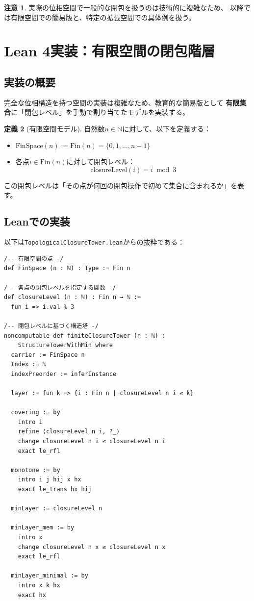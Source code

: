 \documentclass[a4paper,12pt]{ltjsarticle}
\theoremstyle{definition}
\newtheorem{definition}{定義}[section]
\newtheorem{remark}[definition]{注意}
\begin{document}
\begin{remark}
実際の位相空間で一般的な閉包を扱うのは技術的に複雑なため、
以降では有限空間での簡易版と、特定の拡張空間での具体例を扱う。
\end{remark}

\section{Lean 4実装：有限空間の閉包階層}

\subsection{実装の概要}

完全な位相構造を持つ空間の実装は複雑なため、教育的な簡易版として
\textbf{有限集合}に「閉包レベル」を手動で割り当てたモデルを実装する。

\begin{definition}[有限空間モデル]\label{def:finspace}
自然数$n \in \mathbb{N}$に対して、以下を定義する：
\begin{itemize}
\item $\mathrm{FinSpace}(n) := \mathrm{Fin}(n) = \{0, 1, \ldots, n-1\}$
\item 各点$i \in \mathrm{Fin}(n)$に対して閉包レベル：
\[
\mathrm{closureLevel}(i) = i \bmod 3
\]
\end{itemize}

この閉包レベルは「その点が何回の閉包操作で初めて集合に含まれるか」を表す。
\end{definition}

\subsection{Leanでの実装}

以下は\texttt{TopologicalClosureTower.lean}からの抜粋である：

\begin{lstlisting}[language=Lean]
/-- 有限空間の点 -/
def FinSpace (n : ℕ) : Type := Fin n

/-- 各点の閉包レベルを指定する関数 -/
def closureLevel (n : ℕ) : Fin n → ℕ :=
  fun i => i.val % 3

/-- 閉包レベルに基づく構造塔 -/
noncomputable def finiteClosureTower (n : ℕ) :
    StructureTowerWithMin where
  carrier := FinSpace n
  Index := ℕ
  indexPreorder := inferInstance

  layer := fun k => {i : Fin n | closureLevel n i ≤ k}

  covering := by
    intro i
    refine ⟨closureLevel n i, ?_⟩
    change closureLevel n i ≤ closureLevel n i
    exact le_rfl

  monotone := by
    intro i j hij x hx
    exact le_trans hx hij

  minLayer := closureLevel n

  minLayer_mem := by
    intro x
    change closureLevel n x ≤ closureLevel n x
    exact le_rfl

  minLayer_minimal := by
    intro x k hx
    exact hx
\end{lstlisting}
\end{document}
